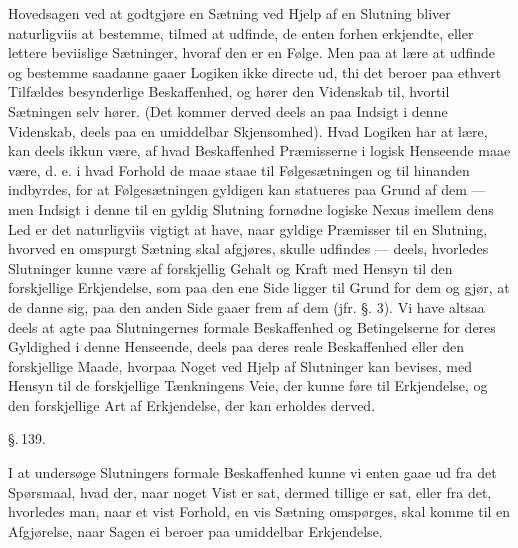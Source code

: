 \documentclass[12pt]{book}
\def\textit#1{#1}%
\def\emph#1{#1}%
\newcommand{\parag}[1]{%
  \par\vspace{0.9\baselineskip}%
  {\centering\textit{\S.\,#1.}\par}%
  \vspace{0.35\baselineskip}%
  \noindent\hspace{\parindent}\ignorespaces
}
\newcommand{\opage}[1]{\marginnote{\footnotesize\textit{[#1]}}}
\begin{document}
Hovedsagen ved at godtgjøre en Sætning ved Hjelp af en Slutning bliver naturligviis at
bestemme, tilmed at udfinde, de enten forhen erkjendte, eller lettere beviislige
Sætninger, hvoraf den er en Følge. Men paa at lære at udfinde og bestemme saadanne
gaaer Logiken ikke directe ud, thi det beroer paa ethvert Tilfældes besynderlige
Beskaffenhed, og hører den Videnskab til, hvortil Sætningen selv hører. (Det kommer
derved deels an paa Indsigt i denne Videnskab, deels paa en umiddelbar Skjensomhed).
Hvad Logiken har at lære, kan deels ikkun være, af hvad Beskaffenhed Præmisserne i
logisk Henseende maae være, d. e. i hvad Forhold de maae staae til Følgesætningen og
til hinanden indbyrdes, for at Følgesætningen gyldigen kan statueres paa Grund af dem
--- men Indsigt i denne til en gyldig Slutning fornødne logiske \emph{Nexus} imellem
dens Led er det naturligviis vigtigt at have, naar gyldige Præmisser til en Slutning,
hvorved en omspurgt Sætning skal
\opage{326} afgjøres, skulle udfindes --- deels, hvorledes Slutninger kunne være af forskjellig
Gehalt og Kraft med Hensyn til den forskjellige Erkjendelse, som paa den ene Side
ligger til Grund for dem og gjør, at de danne sig, paa den anden Side gaaer frem af dem
(jfr. §. 3). Vi have altsaa deels at agte paa Slutningernes formale Beskaffenhed og
Betingelserne for deres Gyldighed i denne Henseende, deels paa deres reale
Beskaffenhed eller den forskjellige Maade, hvorpaa Noget ved Hjelp af Slutninger kan
bevises, med Hensyn til de forskjellige Tænkningens Veie, der kunne føre til
Erkjendelse, og den forskjellige Art af Erkjendelse, der kan erholdes derved.

\parag{139}

I at undersøge Slutningers formale Beskaffenhed kunne vi enten gaae ud fra det
Spørsmaal, hvad der, naar noget Vist er sat, dermed tillige er sat, eller fra det,
hvorledes man, naar et vist Forhold, en vis Sætning omspørges, skal komme til en
Afgjørelse, naar Sagen ei beroer paa umiddelbar Erkjendelse.
\end{document}
